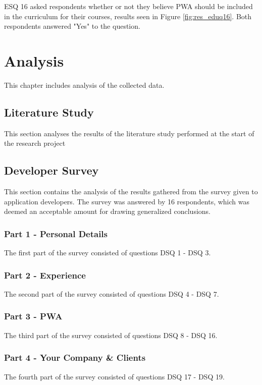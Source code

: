 \documentclass[a4paper,12pt]{article}
\renewcommand{\arraystretch}{1.5}
\begin{document}
ESQ 16 asked respondents whether or not they believe PWA should be included in the curriculum for their courses, results seen in Figure \ref{fig:res_eduq16}. Both respondents answered "Yes" to the question.

\setlength{\arrayrulewidth}{0.5mm}
\setlength{\tabcolsep}{8pt}
\renewcommand{\arraystretch}{1.5}
\newpage

\section{Analysis}
\label{Analysis}
This chapter includes analysis of the collected data.

\subsection{Literature Study}
\label{Analysis_study}
This section analyses the results of the literature study performed at the start of the research project

\subsection{Developer Survey}
\label{Analysis_devSurvey}
This section contains the analysis of the results gathered from the survey given to application developers. The survey was answered by 16 respondents, which was deemed an acceptable amount for drawing generalized conclusions.

\subsubsection{Part 1 - Personal Details}
\label{Analysis_devSurvey_part1}
The first part of the survey consisted of questions DSQ 1 - DSQ 3. 

\subsubsection{Part 2 - Experience}
\label{Analysis_devSurvey_part2}
The second part of the survey consisted of questions DSQ 4 - DSQ 7. 

\subsubsection{Part 3 - PWA}
\label{Analysis_devSurvey_part3}
The third part of the survey consisted of questions DSQ 8 - DSQ 16. 

\subsubsection{Part 4 - Your Company \& Clients}
\label{Analysis_devSurvey_part4}
The fourth part of the survey consisted of questions DSQ 17 - DSQ 19. 
\end{document}
